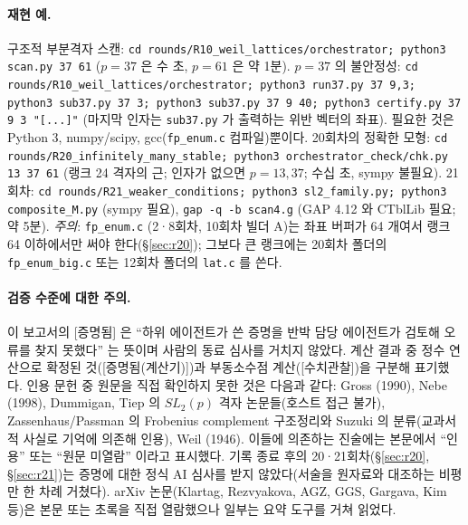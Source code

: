 \paragraph{재현 예.} 구조적 부분격자 스캔: \texttt{cd rounds/R10\_weil\_lattices/orchestrator; python3 scan.py 37 61} ($p=37$ 은 수 초, $p=61$ 은 약 1분). $p=37$ 의 불안정성: \texttt{cd rounds/R10\_weil\_lattices/orchestrator; python3 run37.py 37 9,3; python3 sub37.py 37 3; python3 sub37.py 37 9 40; python3 certify.py 37 9 3 "[...]"} (마지막 인자는 \texttt{sub37.py} 가 출력하는 위반 벡터의 좌표). 필요한 것은 Python 3, numpy/scipy, gcc(\texttt{fp\_enum.c} 컴파일)뿐이다. 20회차의 정확한 모형: \texttt{cd rounds/R20\_infinitely\_many\_stable; python3 orchestrator\_check/chk.py 13 37 61} (랭크 24 격자의 근; 인자가 없으면 $p=13,37$; 수십 초, sympy 불필요). 21회차: \texttt{cd rounds/R21\_weaker\_conditions; python3 sl2\_family.py; python3 composite\_M.py} (sympy 필요), \texttt{gap -q -b scan4.g} (GAP 4.12 와 CTblLib 필요; 약 5분). \emph{주의}: \texttt{fp\_enum.c} (2·8회차, 10회차 빌더 A)는 좌표 버퍼가 64 개여서 랭크 64 이하에서만 써야 한다(\S\ref{sec:r20}); 그보다 큰 랭크에는 20회차 폴더의 \texttt{fp\_enum\_big.c} 또는 12회차 폴더의 \texttt{lat.c} 를 쓴다.
\paragraph{검증 수준에 대한 주의.} 이 보고서의 [증명됨] 은 ``하위 에이전트가 쓴 증명을 반박 담당 에이전트가 검토해 오류를 찾지 못했다'' 는 뜻이며 사람의 동료 심사를 거치지 않았다. 계산 결과 중 정수 연산으로 확정된 것([증명됨(계산기)])과 부동소수점 계산([수치관찰])을 구분해 표기했다. 인용 문헌 중 원문을 직접 확인하지 못한 것은 다음과 같다: Gross (1990), Nebe (1998), Dummigan, Tiep 의 $SL_2(p)$ 격자 논문들(호스트 접근 불가), Zassenhaus/Passman 의 Frobenius complement 구조정리와 Suzuki 의 분류(교과서적 사실로 기억에 의존해 인용), Weil (1946). 이들에 의존하는 진술에는 본문에서 ``인용'' 또는 ``원문 미열람'' 이라고 표시했다. 기록 종료 후의 20·21회차(\S\ref{sec:r20}, \S\ref{sec:r21})는 증명에 대한 정식 AI 심사를 받지 않았다(서술을 원자료와 대조하는 비평만 한 차례 거쳤다). arXiv 논문(Klartag, Rezvyakova, AGZ, GGS, Gargava, Kim 등)은 본문 또는 초록을 직접 열람했으나 일부는 요약 도구를 거쳐 읽었다.
